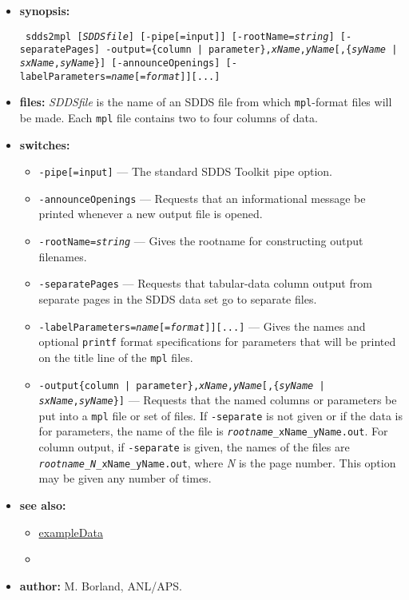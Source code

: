 \begin{itemize}
\item {\bf synopsis:}
\begin{flushleft}{\tt
sdds2mpl [{\em SDDSfile}] [-pipe[=input]] [-rootName={\em string}] [-separatePages] 
-output=\{column | parameter\},{\em xName},{\em yName}[,\{{\em syName} | {\em sxName},{\em syName}\}]
[-announceOpenings] [-labelParameters={\em name}[={\em format}]][...]
}\end{flushleft}
\item {\bf files:}
{\em SDDSfile} is the name of an SDDS file from which {\tt mpl}-format files will be made.  Each 
{\tt mpl} file contains two to four columns of data.
\item {\bf switches:}
   \begin{itemize}
   \item \verb|-pipe[=input]| --- The standard SDDS Toolkit pipe option.
   \item \verb|-announceOpenings| --- Requests that an informational message be printed whenever a new
   output file is opened.
   \item  {\tt -rootName={\em string}} --- Gives the rootname for constructing output filenames.
   \item \verb|-separatePages| --- Requests that tabular-data column output from separate pages in the SDDS
   data set go to separate files.
   \item {\tt -labelParameters={\em name}[={\em format}]][...]} --- 
        Gives the names and optional \verb|printf| format specifications for
   parameters that will be printed on the title line of the \verb|mpl| files.
   \item {\tt -output\{column | parameter\},{\em xName},{\em yName}[,\{{\em syName} | {\em sxName},{\em syName}\}]} 
        --- Requests that the named columns or parameters be put into a \verb|mpl| file or set
        of files.  If \verb|-separate| is not given or if the data is for parameters, the name of the file is 
       {\tt {\em rootname}\_{xName}\_{yName}.out}.  For column output, if \verb|-separate| is given, the names of the
       files are {\tt {\em rootname}\_{\em N}\_{xName}\_{yName}.out}, where {\em N} is the page number.  This 
        option may be given any number of times.
   \end{itemize}

\item {\bf see also:}
    \begin{itemize}
    \item \hyperref{Data for Examples}{Data for Examples (see }{)}{exampleData}
    \item {}
    \end{itemize}
\item {\bf author:} M. Borland, ANL/APS.
\end{itemize}

